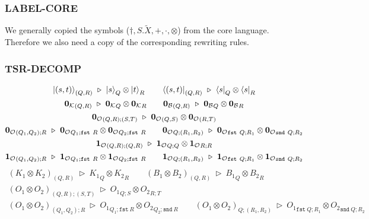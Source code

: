 \documentclass[manuscript, review, timestamp]{acmart}
\newcommand*{\fst}{\texttt{fst}}
\newcommand*{\snd}{\texttt{snd}}
\newcommand*{\reduce}{\ \triangleright\ }
\begin{document}
\subsubsection*{\textsf{LABEL-CORE}}
We generally copied the symbols ($\dagger, S.\tilde{X}, +, \cdot, \otimes$) from the core language. Therefore we also need a copy of the corresponding rewriting rules.

\subsubsection*{\textsf{TSR-DECOMP}}

\begin{gather*}
  \ket{(s, t)}_{(Q, R)} \reduce \ket{s}_{Q} \otimes \ket{t}_{R}
  \qquad
  \bra{(s, t)}_{(Q, R)} \reduce \bra{s}_{Q} \otimes \bra{s}_{R} \\
  {\mathbf{0}_\mathcal{K}}_{(Q, R)} \reduce {\mathbf{0}_\mathcal{K}}_{Q} \otimes {\mathbf{0}_\mathcal{K}}_{R}
  \qquad
  {\mathbf{0}_\mathcal{B}}_{(Q, R)} \reduce {\mathbf{0}_\mathcal{B}}_{Q} \otimes {\mathbf{0}_\mathcal{B}}_{R} \\
  {\mathbf{0}_\mathcal{O}}_{(Q, R); (S, T)} \reduce {\mathbf{0}_\mathcal{O}}_{(Q, S)} \otimes {\mathbf{0}_\mathcal{O}}_{(R, T)} \\
  {\mathbf{0}_\mathcal{O}}_{(Q_1, Q_2); R} \reduce {\mathbf{0}_\mathcal{O}}_{Q_1; \fst\ R} \otimes {\mathbf{0}_\mathcal{O}}_{Q_2; \fst\ R}
  \qquad
  {\mathbf{0}_\mathcal{O}}_{Q; (R_1, R_2)} \reduce {\mathbf{0}_\mathcal{O}}_{\fst\ Q; R_1} \otimes {\mathbf{0}_\mathcal{O}}_{\snd\ Q; R_2} \\
  {\mathbf{1}_\mathcal{O}}_{(Q, R); (Q, R)} \reduce {\mathbf{1}_\mathcal{O}}_{Q; Q} \otimes {\mathbf{1}_\mathcal{O}}_{R; R} \\
  {\mathbf{1}_\mathcal{O}}_{(Q_1, Q_2); R} \reduce {\mathbf{1}_\mathcal{O}}_{Q_1; \fst\ R} \otimes {\mathbf{1}_\mathcal{O}}_{Q_2; \fst\ R}
  \qquad
  {\mathbf{1}_\mathcal{O}}_{Q; (R_1, R_2)} \reduce {\mathbf{1}_\mathcal{O}}_{\fst\ Q; R_1} \otimes {\mathbf{1}_\mathcal{O}}_{\snd\ Q; R_2}
\end{gather*}
\begin{gather*}
  (K_1 \otimes K_2)_{(Q, R)} \reduce {K_1}_{Q} \otimes {K_2}_{R}
  \qquad
  (B_1 \otimes B_2)_{(Q, R)} \reduce {B_1}_{Q} \otimes {B_2}_{R} \\
  (O_1 \otimes O_2)_{(Q, R); (S, T)} \reduce {O_1}_{Q; S} \otimes {O_2}_{R; T} \\
  (O_1 \otimes O_2)_{(Q_1, Q_2); R} \reduce {O_1}_{Q_1; \fst\ R} \otimes {O_2}_{Q_2; \snd\ R}
  \qquad
  (O_1 \otimes O_2)_{Q; (R_1, R_2)} \reduce {O_1}_{\fst\ Q; R_1} \otimes {O_2}_{\snd\ Q; R_2}
\end{gather*}
\end{document}
